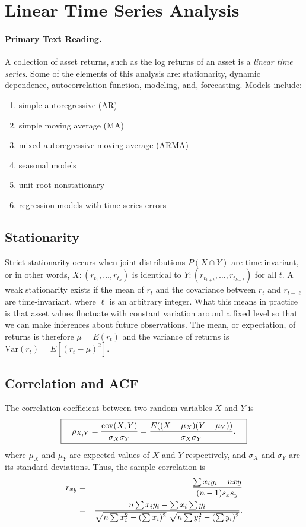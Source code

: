 \section{Linear Time Series Analysis}
\paragraph{Primary Text Reading.} 

A collection of asset returns, such as the log returns of an asset is a \emph{linear time series}. Some of the elements of this analysis are: stationarity, dynamic dependence, autocorrelation function, modeling, and, forecasting. Models include:
\begin{enumerate}
\item simple autoregressive (AR)
\item simple moving average (MA)
\item mixed autoregressive moving-average (ARMA)
\item seasonal models
\item unit-root nonstationary
\item regression models with time series errors
\end{enumerate}

\subsection{Stationarity}\label{Stationarity}
Strict stationarity occurs when joint distributions $P(X \cap Y)$ are time-invari\-ant, or in other words, $X:(r_{t_1}, \ldots, r_{t_k})$ is identical to $Y:(r_{t_{1+t}}, \ldots, r_{t_{k+t}})$ for all $t$. A weak stationarity exists if the mean of $r_t$ and the covariance between $r_t$ and $r_{t-\ell}$ are time-invariant, where $\ell$ is an arbitrary integer. What this means in practice is that asset values fluctuate with constant variation around a fixed level so that we can make inferences about future observations. The mean, or expectation, of returns is therefore $\mu = E(r_t)$ and the variance of returns is $\text{Var}(r_t) = E[(r_t - \mu)^2]$.

\subsection{Correlation and ACF}
The correlation coefficient between two random variables $X$ and $Y$ is
\[
\boxed{\quad \rho_{X,Y}={\mathrm{cov}(X,Y) \over \sigma_X \sigma_Y} ={E((X-\mu_X)(Y-\mu_Y)) \over \sigma_X\sigma_Y}, \quad}
\]
where $\mu_X$ and $\mu_Y$ are expected values of $X$ and $Y$ respectively, and $\sigma_X$ and $\sigma_Y$ are its standard deviations. Thus, the sample correlation is
\begin{eqnarray}
r_{xy}&=&\frac{\sum x_iy_i-n \bar{x} \bar{y}}{(n-1) s_x s_y} \\
\smallskip
&=&\frac{n\sum x_iy_i-\sum x_i\sum y_i} {\sqrt{n\sum x_i^2-(\sum x_i)^2}~\sqrt{n\sum y_i^2-(\sum y_i)^2}}. \notag
\end{eqnarray}

